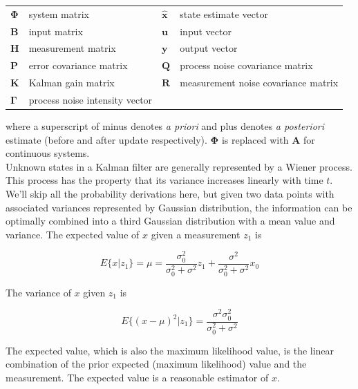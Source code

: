 \documentclass[10pt,conference,compsoc]{IEEEtran}
\newcommand{\mtx}[1] {\bm #1}
\begin{document}
\begin{table}[ht]
  \renewcommand{\arraystretch}{1.3}
  \centering
  \begin{tabulary}{\linewidth}{LLLL}
    $\mtx{\Phi}$ & system matrix &
      $\hat{\mtx{x}}$ & state estimate vector \\
    $\mtx{B}$ & input matrix            & $\mtx{u}$ & input vector \\
    $\mtx{H}$ & measurement matrix      & $\mtx{y}$ & output vector \\
    $\mtx{P}$ & error covariance matrix &
      $\mtx{Q}$ & process noise covariance matrix \\
    $\mtx{K}$ & Kalman gain matrix &
      $\mtx{R}$ & measurement noise covariance matrix \\
    $\mtx{\Gamma}$ & process noise intensity vector &
  \end{tabulary}
  \label{tab:kalman_def}
\end{table}

\noindent where a superscript of minus denotes \textit{a priori} and plus
denotes \textit{a posteriori} estimate (before and after update respectively).
$\mtx{\Phi}$ is replaced with $\mtx{A}$ for continuous systems. \\

\noindent Unknown states in a Kalman filter are generally represented by a
Wiener process. This process has the property that its variance increases
linearly with time $t$. We'll skip all the probability derivations here, but
given two data points with associated variances represented by Gaussian
distribution, the information can be optimally combined into a third Gaussian
distribution with a mean value and variance. The expected value of $x$ given a
measurement $z_1$ is

\begin{equation}
  E\{x|z_1\} = \mu = \frac{\sigma_0^2}{\sigma_0^2 + \sigma^2}z_1 +
    \frac{\sigma^2}{\sigma_0^2 + \sigma^2}x_0
\end{equation}

\noindent The variance of $x$ given $z_1$ is

\begin{equation}
  E\{(x - \mu)^2|z_1\} = \frac{\sigma^2 \sigma_0^2}{\sigma_0^2 + \sigma^2}
\end{equation}

\noindent The expected value, which is also the maximum likelihood value, is the
linear combination of the prior expected (maximum likelihood) value and the
measurement. The expected value is a reasonable estimator of $x$.
\end{document}
